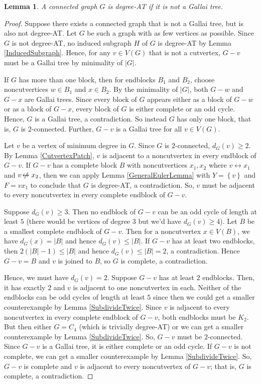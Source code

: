 \documentclass[12pt]{article}
\theoremstyle{plain}
\newtheorem{lem}[thm]{Lemma}
\theoremstyle{definition}
\theoremstyle{remark}
\newcommand{\set}[1]{\left\{ #1 \right\}}
\def\adj{\leftrightarrow}
\def\nonadj{\not\!\leftrightarrow}
\def\adj{\leftrightarrow}
\begin{document}
\begin{lem}\label{DegreeATClassification}
	A connected graph $G$ is degree-AT if it is not a Gallai tree.
\end{lem}
\begin{proof}
	Suppose there exists a connected graph that is not a Gallai tree, but is also not
	degree-AT.  Let $G$ be such a graph with as few vertices as possible.
	Since $G$ is not degree-AT, no induced subgraph $H$ of $G$ is
	degree-AT by Lemma \ref{InducedSubgraph}. 
	Hence, for any $v \in V(G)$ that is not a cutvertex, $G-v$ must be a Gallai
	tree by minimality of $|G|$.  
	
	If $G$ has more than one block, then for endblocks $B_1$ and $B_2$, choose
	noncutvertices $w\in B_1$ and $x\in B_2$.  By the minimality of $|G|$, both
	$G-w$ and $G-x$ are Gallai trees.  Since every block of $G$ appears either as a
	block of $G-w$ or as a block of $G-x$, every block of $G$ is either complete or
	an odd cycle.  Hence, $G$ is a Gallai tree, a contradiction.  So instead $G$
	has only one block, that is, $G$ is $2$-connected.  Further, $G-v$ is a Gallai
	tree for all $v \in V(G)$.
	
	Let $v$ be a vertex of minimum degree in $G$.  Since $G$ is $2$-connected, $d_G(v) \ge 2$. By Lemma \ref{CutvertexPatch}, $v$ is adjacent to a noncutvertex in every endblock of $G-v$.
	If $G-v$ has a complete block $B$ with noncutvertices $x_1,x_2$ where $v \adj x_1$ and $v \nonadj x_2$, then we can apply Lemma \ref{GeneralEulerLemma} with $Y = \set{v}$ and $F = vx_1$ to conclude that $G$ is degree-AT, a contradiction.  So, $v$ must be adjacent to every noncutvertex in every complete endblock of $G-v$.
	
	Suppose $d_G(v) \ge 3$.  Then no endblock of $G-v$ can be an odd cycle of length at least $5$ (there would be vertices of degree $3$ but we'd have $d_G(v) \ge 4$).  Let $B$ be a smallest complete endblock of $G-v$.  Then for a noncutvertex $x \in V(B)$, we have $d_G(x) = |B|$ and hence $d_G(v) \le |B|$.  If $G-v$ has at least two endblocks, then $2(|B|-1) \le |B|$ and hence $d_G(v) \le |B| = 2$, a contradiction.  Hence $G-v = B$ and $v$ is joined to $B$, so $G$ is complete, a contradiction.
	
	Hence, we must have $d_G(v) = 2$.  Suppose $G-v$ has at least $2$ endblocks.  Then, it has exactly $2$ and $v$ is adjacent to one noncutvertex in each.  Neither of the endblocks can be odd cycles of length at least $5$ since then we could get a smaller counterexample by Lemma \ref{SubdivideTwice}.  Since $v$ is adjacent to every noncutvertex in every complete endblock of $G-v$, both endblocks must be $K_2$.  But then either $G=C_4$ (which is trivially degree-AT) or we can get a smaller counterexample by Lemma \ref{SubdivideTwice}.  So, $G-v$ must be $2$-connected. Since $G-v$ is a Gallai tree, it is either complete or an odd cycle.  If $G-v$ is not complete, we can get a smaller counterexample by Lemma \ref{SubdivideTwice}.  So, $G-v$ is complete and $v$ is adjacent to every noncutvertex of $G-v$; that is, $G$ is complete, a contradiction.
\end{proof}




\end{document}
